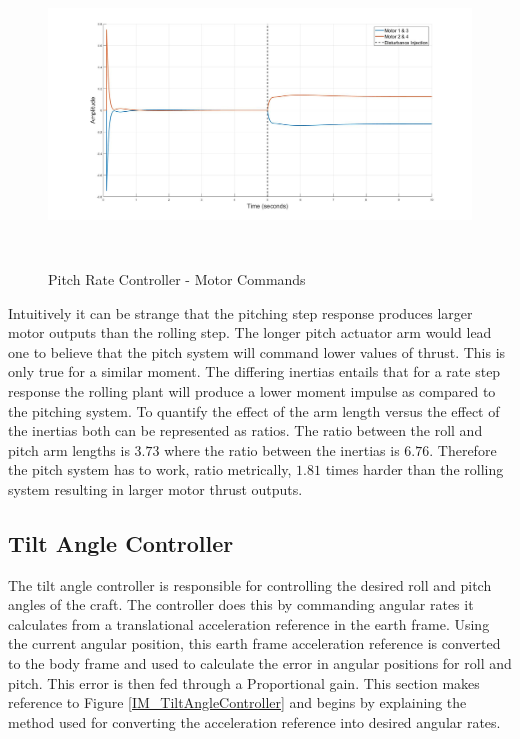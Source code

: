 		\begin{figure}[H]
			\centering
			\includegraphics[height = 8cm]{../Design/Matlab/Controllers/pitch_rate_impulse.jpg}
			\caption{Pitch Rate Controller -  Motor Commands}
			\label{IM_PitchRateImpulse}
		\end{figure}
		
		Intuitively it can be strange that the pitching step response produces larger motor outputs than the rolling step. The longer pitch actuator arm would lead one to believe that the pitch system will command lower values of thrust. This is only true for a similar moment. The differing inertias entails that for a rate step response the rolling plant will produce a lower moment impulse as compared to the pitching system. To quantify the effect of the arm length versus the effect of the inertias both can be represented as ratios. The ratio between the roll and pitch arm lengths is $3.73$ where the ratio between the inertias is $6.76$. Therefore the pitch system has to work, ratio metrically, $1.81$ times harder than the rolling system resulting in larger motor thrust outputs.
		
	\subsection{Tilt Angle Controller}
	The tilt angle controller is responsible for controlling the desired roll and pitch angles of the craft. The controller does this by commanding angular rates it calculates from a translational acceleration reference in the earth frame. Using the current angular position, this earth frame acceleration reference is converted to the body frame and used to calculate the error in angular positions for roll and pitch. This error is then fed through a Proportional gain. This section makes reference to Figure \ref{IM_TiltAngleController} and begins by explaining the method used for converting the acceleration reference into desired angular rates.
	

